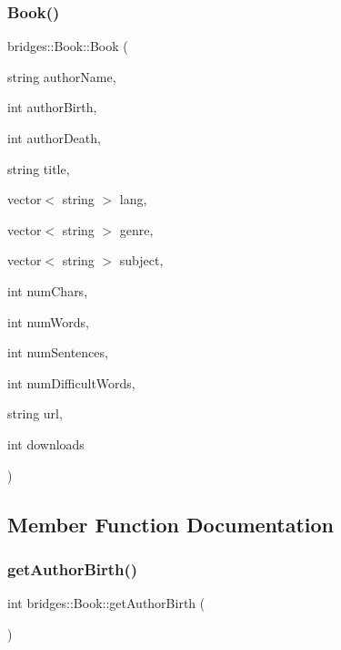 \subsubsection{\texorpdfstring{Book()}{Book()}\hspace{0.1cm}{\footnotesize\ttfamily [2/2]}}
{\footnotesize\ttfamily bridges\+::\+Book\+::\+Book (\begin{DoxyParamCaption}\item[{string}]{author\+Name,  }\item[{int}]{author\+Birth,  }\item[{int}]{author\+Death,  }\item[{string}]{title,  }\item[{vector$<$ string $>$}]{lang,  }\item[{vector$<$ string $>$}]{genre,  }\item[{vector$<$ string $>$}]{subject,  }\item[{int}]{num\+Chars,  }\item[{int}]{num\+Words,  }\item[{int}]{num\+Sentences,  }\item[{int}]{num\+Difficult\+Words,  }\item[{string}]{url,  }\item[{int}]{downloads }\end{DoxyParamCaption})\hspace{0.3cm}{\ttfamily [inline]}}



\subsection{Member Function Documentation}
\mbox{\label{classbridges_1_1_book_aab2b100c668996d17c45817b81323d93}} 
\subsubsection{\texorpdfstring{get\+Author\+Birth()}{getAuthorBirth()}}
{\footnotesize\ttfamily int bridges\+::\+Book\+::get\+Author\+Birth (\begin{DoxyParamCaption}{ }\end{DoxyParamCaption})\hspace{0.3cm}{\ttfamily [inline]}}

